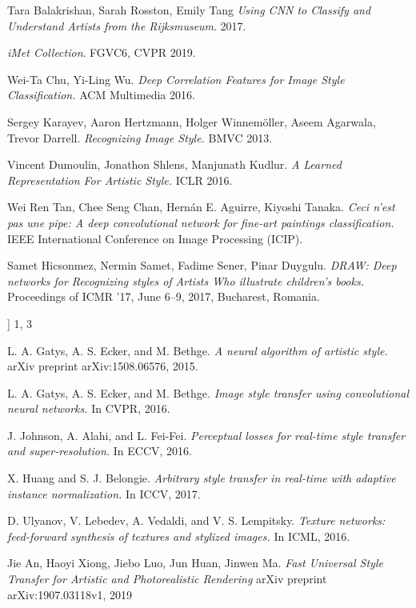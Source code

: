 \documentclass[10pt,twocolumn,letterpaper]{article}
\begin{document}
{\small


\begin{thebibliography}{9}

Tara Balakrishan, Sarah Rosston, Emily Tang
\textit{Using CNN to Classify and Understand Artists from the Rijksmuseum}. 
2017.


\textit{iMet Collection}. 
 FGVC6, CVPR 2019.

Wei-Ta Chu, Yi-Ling Wu.
\textit{Deep Correlation Features for Image Style Classification.}
ACM Multimedia 2016.


Sergey Karayev, Aaron Hertzmann, Holger Winnemöller, Aseem Agarwala, Trevor Darrell.
\textit{Recognizing Image Style.}
BMVC 2013.

Vincent Dumoulin, Jonathon Shlens, Manjunath Kudlur.
\textit{A Learned Representation For Artistic Style.}
ICLR 2016.

Wei Ren Tan, Chee Seng Chan, Hernán E. Aguirre, Kiyoshi Tanaka.
\textit{Ceci n'est pas une pipe: A deep convolutional network for fine-art paintings classification.}
IEEE International Conference on Image Processing (ICIP).

Samet Hicsonmez, Nermin Samet, Fadime Sener, Pinar Duygulu.
\textit{DRAW: Deep networks for Recognizing styles of Artists Who illustrate children's books.}
Proceedings of ICMR ’17, June 6–9, 2017, Bucharest, Romania.


]    1, 3

\bibitem{}
L. A. Gatys, A. S. Ecker, and M. Bethge.
\textit{A neural algorithm of artistic style.}
arXiv preprint arXiv:1508.06576, 2015.



\bibitem{}
L. A. Gatys, A. S. Ecker, and M. Bethge.
\textit{Image
style transfer using convolutional neural networks.}
  In
CVPR, 2016.



\bibitem{}
J. Johnson, A. Alahi, and L. Fei-Fei.
\textit{ Perceptual losses
for real-time style transfer and super-resolution.}
 In
ECCV, 2016.

  

\bibitem{}
X. Huang and S. J. Belongie.
\textit{Arbitrary style transfer
in real-time with adaptive instance normalization.}
In
ICCV, 2017.


\bibitem{}
D. Ulyanov, V. Lebedev, A. Vedaldi, and V. S. Lempitsky.
\textit{Texture networks: feed-forward synthesis of
textures and stylized images.}
In ICML, 2016.




\bibitem{}
Jie An, Haoyi Xiong, Jiebo Luo, Jun Huan, Jinwen Ma.
\textit{Fast Universal Style Transfer for Artistic and Photorealistic Rendering}
arXiv preprint arXiv:1907.03118v1, 2019



\end{thebibliography}
}
\end{document}
